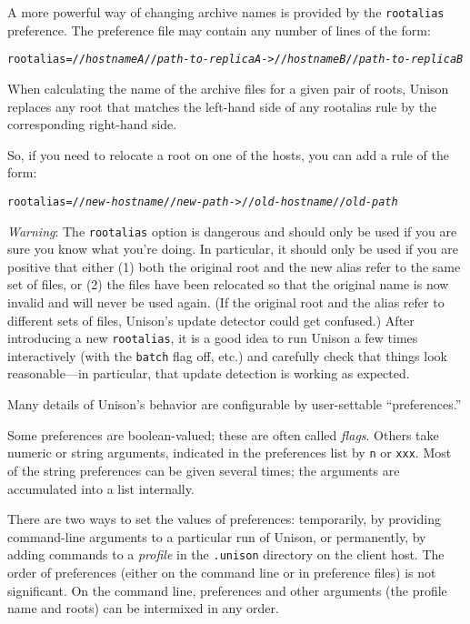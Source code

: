 \documentclass{article}
\newcommand{\NT}[1]{\textit{#1}}
\begin{document}
A more powerful way of changing archive names is provided by the
\verb|rootalias| preference.  The preference file may contain any number of
lines of the form: 
\begin{alltt}
    rootalias = //\NT{hostnameA}//\NT{path-to-replicaA} -> //\NT{hostnameB}//\NT{path-to-replicaB}
\end{alltt}
When calculating the name of the archive files for a given pair of roots,
Unison replaces any root that matches the left-hand side of any rootalias
rule by the corresponding right-hand side.

So, if you need to relocate a root on one of the hosts, you can add a
rule of the form:
\begin{alltt}
    rootalias = //\NT{new-hostname}//\NT{new-path} -> //\NT{old-hostname}//\NT{old-path}
\end{alltt}

{\em Warning}: The \verb|rootalias| option is dangerous and should only
be used if you are sure you know what you're doing.  In particular, it
should only be used if you are positive that either (1) both the original
root and the new alias refer to the same set of files, or (2) the files
have been relocated so that the original name is now invalid and will
never be used again.  (If the original root and the alias refer to
different sets of files, Unison's update detector could get confused.)
%
After introducing a new \verb|rootalias|, it is a good idea to run Unison
a few times interactively (with the \verb|batch| flag off, etc.) and
carefully check that things look reasonable---in particular, that update
detection is working as expected.



Many details of Unison's behavior are configurable by user-settable
``preferences.''  

Some preferences are boolean-valued; these are often called {\em flags}.
Others take numeric or string arguments, indicated in the preferences
list by {\tt n} or {\tt xxx}.  Most of the string preferences can be
given several times; the arguments are accumulated into a list
internally.

There are two ways to set the values of preferences: temporarily, by
providing command-line arguments to a particular run of Unison, or
permanently, by adding commands to a {\em profile} in the {\tt .unison}
directory on the client host.  The order of preferences (either on the
command line or in preference files) is not significant.  On the command
line, preferences and other arguments (the profile name and roots) can be
intermixed in any order.
\end{document}
